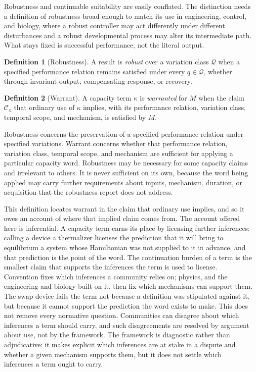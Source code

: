 \documentclass[11pt]{article}
\theoremstyle{definition}
\newtheorem{definition}{Definition}
\newcommand{\Cclaim}{\mathcal C}
\begin{document}
Robustness and continuable suitability are easily conflated. The distinction needs a definition of robustness broad enough to match its use in engineering, control, and biology, where a robust controller may act differently under different disturbances and a robust developmental process may alter its intermediate path. What stays fixed is successful performance, not the literal output.

\begin{definition}[Robustness]
A result is \emph{robust} over a variation class $\mathcal Q$ when a specified performance relation remains satisfied under every $q\in\mathcal Q$, whether through invariant output, compensating response, or recovery.
\end{definition}

\begin{definition}[Warrant]
A capacity term $\kappa$ is \emph{warranted} for $M$ when the claim $\Cclaim_\kappa$ that ordinary use of $\kappa$ implies, with its performance relation, variation class, temporal scope, and mechanism, is satisfied by $M$.
\end{definition}

Robustness concerns the preservation of a specified performance relation under specified variations. Warrant concerns whether that performance relation, variation class, temporal scope, and mechanism are sufficient for applying a particular capacity word. Robustness may be necessary for some capacity claims and irrelevant to others. It is never sufficient on its own, because the word being applied may carry further requirements about inputs, mechanism, duration, or acquisition that the robustness report does not address.

This definition locates warrant in the claim that ordinary use implies, and so it owes an account of where that implied claim comes from. The account offered here is inferential. A capacity term earns its place by licensing further inferences: calling a device a thermalizer licenses the prediction that it will bring to equilibrium a system whose Hamiltonian was not supplied to it in advance, and that prediction is the point of the word. The continuation burden of a term is the smallest claim that supports the inferences the term is used to license. Convention fixes which inferences a community relies on; physics, and the engineering and biology built on it, then fix which mechanisms can support them. The swap device fails the term not because a definition was stipulated against it, but because it cannot support the prediction the word exists to make. This does not remove every normative question. Communities can disagree about which inferences a term should carry, and such disagreements are resolved by argument about use, not by the framework. The framework is diagnostic rather than adjudicative: it makes explicit which inferences are at stake in a dispute and whether a given mechanism supports them, but it does not settle which inferences a term ought to carry.
\end{document}
